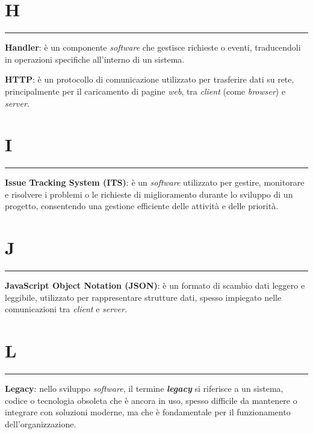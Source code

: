 \section*{H}
{\color{lightgray}\rule{\textwidth}{0.4pt}} %
\begin{glossaryitemize}
    \item \textbf{Handler}: è un componente \textit{software} che gestisce richieste o eventi, traducendoli in operazioni specifiche all'interno di un sistema.
    \item \textbf{HTTP}: è un protocollo di comunicazione utilizzato per trasferire dati su rete, principalmente per il caricamento di pagine \textit{web}, tra \textit{client} (come \textit{browser}) e \textit{server}.
\end{glossaryitemize}

\section*{I}
{\color{lightgray}\rule{\textwidth}{0.4pt}} %
\begin{glossaryitemize}
    \item \textbf{Issue Tracking System (ITS)}: è un \textit{software} utilizzato per gestire, monitorare e risolvere i problemi o le richieste di miglioramento durante lo sviluppo di un progetto, consentendo una gestione efficiente delle attività e delle priorità.
\end{glossaryitemize}

\section*{J}
{\color{lightgray}\rule{\textwidth}{0.4pt}} %
\begin{glossaryitemize}
    \item \textbf{JavaScript Object Notation (JSON)}: è un formato di scambio dati leggero e leggibile, utilizzato per rappresentare strutture dati, spesso impiegato nelle comunicazioni tra \textit{client} e \textit{server}.
\end{glossaryitemize}

\section*{L}
{\color{lightgray}\rule{\textwidth}{0.4pt}} %
\begin{glossaryitemize}
    \item \textbf{Legacy}: nello sviluppo \textit{software}, il termine \textit{\textbf{legacy}} si riferisce a un sistema, codice o tecnologia obsoleta che è ancora in uso, spesso difficile da mantenere o integrare con soluzioni moderne, ma che è fondamentale per il funzionamento dell'organizzazione.
\end{glossaryitemize}

